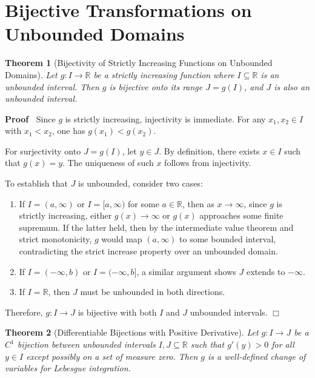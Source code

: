 \documentclass{article}
\newenvironment{proof}{\noindent\textbf{Proof\ }}{\hspace*{\fill}$\Box$\medskip}
\newtheorem{theorem}{Theorem}
\begin{document}
\section{Bijective Transformations on Unbounded Domains}

\begin{theorem}[Bijectivity of Strictly Increasing Functions on Unbounded
Domains]
  \label{thm:bijective_unbounded}Let $g : I \to \mathbb{R}$ be a strictly
  increasing function where $I \subseteq \mathbb{R}$ is an unbounded interval.
  Then $g$ is bijective onto its range $J = g (I)$, and $J$ is also an
  unbounded interval.
\end{theorem}

\begin{proof}
  Since $g$ is strictly increasing, injectivity is immediate. For any $x_1,
  x_2 \in I$ with $x_1 < x_2$, one has $g (x_1) < g (x_2)$.
  
  For surjectivity onto $J = g (I)$, let $y \in J$. By definition, there
  exists $x \in I$ such that $g (x) = y$. The uniqueness of such $x$ follows
  from injectivity.
  
  To establish that $J$ is unbounded, consider two cases:
  \begin{enumerate}
    \item If $I = (a, \infty)$ or $I = [a, \infty)$ for some $a \in
    \mathbb{R}$, then as $x \to \infty$, since $g$ is strictly increasing,
    either $g (x) \to \infty$ or $g (x)$ approaches some finite supremum. If
    the latter held, then by the intermediate value theorem and strict
    monotonicity, $g$ would map $(a, \infty)$ to some bounded interval,
    contradicting the strict increase property over an unbounded domain.
    
    \item If $I = (- \infty, b)$ or $I = (- \infty, b]$, a similar argument
    shows $J$ extends to $- \infty$.
    
    \item If $I =\mathbb{R}$, then $J$ must be unbounded in both directions.
  \end{enumerate}
  Therefore, $g : I \to J$ is bijective with both $I$ and $J$ unbounded
  intervals.
\end{proof}

\begin{theorem}[Differentiable Bijections with Positive Derivative]
  \label{thm:diff_bijective}Let $g : I \to J$ be a $C^1$ bijection between
  unbounded intervals $I, J \subseteq \mathbb{R}$ such that $g' (y) > 0$ for
  all $y \in I$ except possibly on a set of measure zero. Then $g$ is a
  well-defined change of variables for Lebesgue integration.
\end{theorem}
\end{document}
